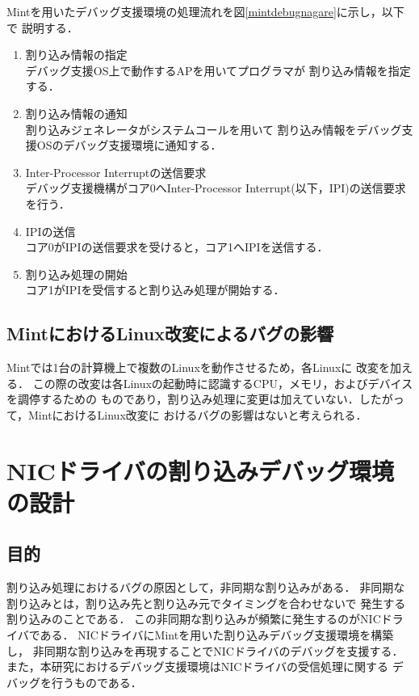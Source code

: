 \documentclass[tanilab-enum]{graduate}
\begin{document}
    Mintを用いたデバッグ支援環境の処理流れを図\ref{mintdebugnagare}に示し，以下で
    説明する．
    \begin{enumerate}
        \item 割り込み情報の指定\\
            デバッグ支援OS上で動作するAPを用いてプログラマが
            割り込み情報を指定する．
        \item 割り込み情報の通知\\
            割り込みジェネレータがシステムコールを用いて
            割り込み情報をデバッグ支援OSのデバッグ支援環境に通知する．
        \item Inter-Processor Interruptの送信要求\\
            デバッグ支援機構がコア0へInter-Processor Interrupt(以下，IPI)の送信要求を行う．
        \item IPIの送信\\
            コア0がIPIの送信要求を受けると，コア1へIPIを送信する．
        \item 割り込み処理の開始\\
            コア1がIPIを受信すると割り込み処理が開始する．
    \end{enumerate}
\section{MintにおけるLinux改変によるバグの影響}
Mintでは1台の計算機上で複数のLinuxを動作させるため，各Linuxに
改変\cite{kitagawa}を加える．
この際の改変は各Linuxの起動時に認識するCPU，メモリ，およびデバイスを調停するための
ものであり，割り込み処理に変更は加えていない．したがって，MintにおけるLinux改変に
おけるバグの影響はないと考えられる．
\chapter{NICドライバの割り込みデバッグ環境の設計}\label{chap:plan}
\section{目的}
割り込み処理におけるバグの原因として，非同期な割り込みがある．
非同期な割り込みとは，割り込み先と割り込み元でタイミングを合わせないで
発生する割り込みのことである．
この非同期な割り込みが頻繁に発生するのがNICドライバである．
NICドライバにMintを用いた割り込みデバッグ支援環境を構築し，
非同期な割り込みを再現することでNICドライバのデバッグを支援する．
また，本研究におけるデバッグ支援環境はNICドライバの受信処理に関する
デバッグを行うものである．
\end{document}
